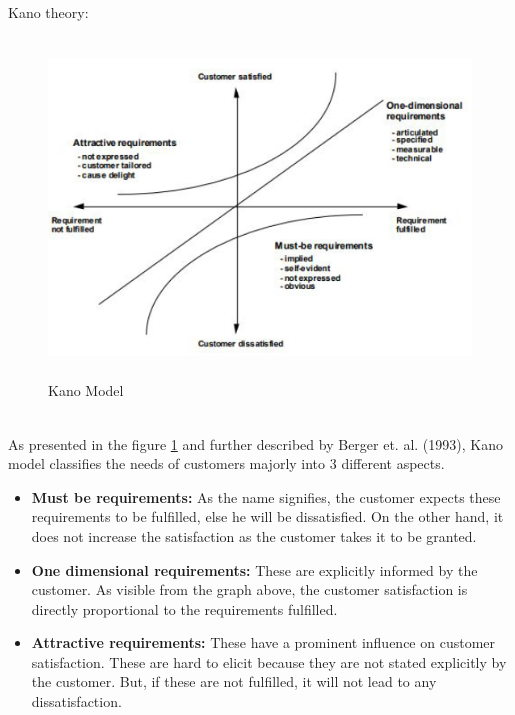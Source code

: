 Kano theory:\\
    \begin{figure}[H]
    \centering
    \captionsetup{justification=centering, margin=2cm}
    \vspace{1cm}
    \includegraphics[width=12cm, height=9cm]{figure/auxiliary/fig45.PNG}
    \caption{Kano Model}
    \label{fig:4.5}
\end{figure}\\
As presented in the figure \ref{fig:4.5} and further described by Berger et. al. (1993), Kano model classifies the needs of customers majorly into 3 different aspects.\\

\begin{itemize}
\item \textbf{Must be requirements:} As the name signifies, the customer expects these requirements to be fulfilled, else he will be dissatisfied. On the other hand, it does not increase the satisfaction as the customer takes it to be granted.\\

\item \textbf{One dimensional requirements:} These are explicitly informed by the customer. As visible from the graph above, the customer satisfaction is directly proportional to the requirements fulfilled.\\

\item \textbf{Attractive requirements:} These have a prominent influence on customer satisfaction. These are hard to elicit because they are not stated explicitly by the customer. But, if these are not fulfilled, it will not lead to any dissatisfaction.\\
\end{itemize}

